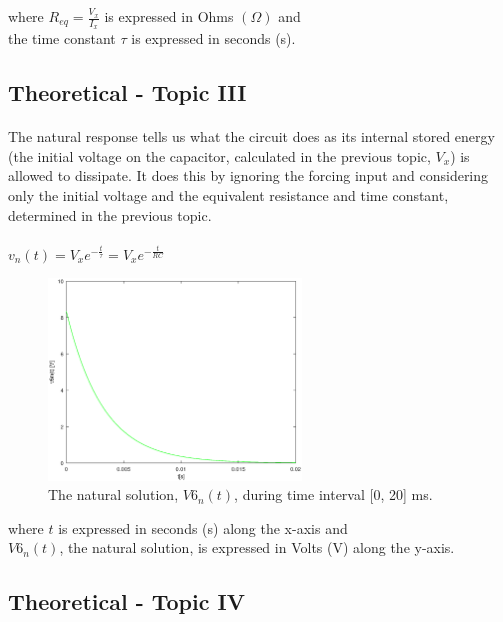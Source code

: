  where $ R_{eq} = \frac{V_x}{I_x} $ is expressed in Ohms $(\Omega)$ and \\
 the time constant $\tau$ is expressed in seconds (s). 
 
\subsection{Theoretical - Topic III}
\label{subsec:third_topic}

\paragraph{}
The natural response tells us what the circuit does as its internal stored energy (the initial voltage on the capacitor, calculated in the previous topic, $V_x$) is allowed to dissipate. It does this by ignoring the forcing input and considering only the initial voltage and the equivalent resistance and time constant, determined in the previous topic.

\paragraph{}
$ v_n(t)=V_x e^{-\frac{t}{\tau}}=V_x e^{-\frac{t}{RC}} $

\begin{figure}[H] \centering
\includegraphics[width=0.6\textwidth]{natural.eps}
\caption{The natural solution, $V6_n(t)$, during time interval [0, 20] ms.}
\label{fig:theo_third}
\end{figure}

where $t$ is expressed in seconds (s) along the x-axis and \\
$V6_n(t)$, the natural solution, is expressed in Volts (V) along the y-axis.


 
\subsection{Theoretical - Topic IV}
\label{subsec:fourth_topic}

